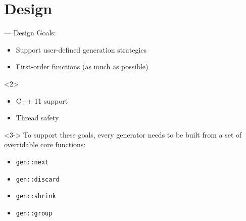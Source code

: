 \section{Design}

\begin{frame}[t]{\halcheck{} --- Design}
  Goals:
  \begin{itemize}
    \item Support user-defined generation strategies
    \item First-order functions (as much as possible)
  \end{itemize}

  \begin{onlyenv}<2>
    \begin{itemize}
      \item C++ 11 support
      \item Thread safety
    \end{itemize}
  \end{onlyenv}

  \begin{onlyenv}<3->
    To support these goals, every generator needs to be built from a set of \alert{overridable core functions}:

    \begin{itemize}
      \item<4-> \texttt{gen::next}
      \item<4-> \texttt{gen::discard}
      \item<4-> \texttt{gen::shrink}
      \item<4-> \texttt{gen::group}
    \end{itemize}
  \end{onlyenv}
\end{frame}

